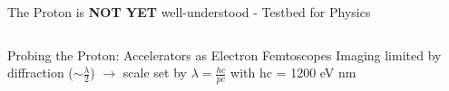 \documentclass[aspectratio=169]{beamer}
\newcommand*{\myfont}{\fontfamily{lmtt}\selectfont}
\begin{document}
\begin{frame}{The Proton is \textbf{NOT YET} well-understood - Testbed for Physics}
\begin{columns}
            \quad \quad \quad  {\myfont{\tiny \quad \quad \quad [Proton Puzzles, Nat Rev Phys, 2021]   }}
                
            
    \end{columns}
\end{frame}


\begin{frame}{Probing the Proton: Accelerators as Electron Femtoscopes}
Imaging limited by diffraction ($\sim \frac{\lambda}{2}$) $\rightarrow$ scale set by $\lambda = \frac{hc}{pc}$ with hc = 1200 eV nm
\end{frame}
\end{document}
